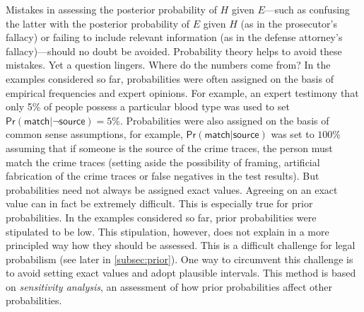 \documentclass{article}
\newcommand{\pr}{\mathsf{Pr}}
\begin{document}
Mistakes in assessing the posterior probability of $H$ given $E$---such as confusing the latter with the posterior probability of $E$ given $H$ (as in the prosecutor's fallacy) or failing to include relevant information (as in the defense attorney's fallacy)---should no doubt be avoided. Probability theory helps to avoid these mistakes. %
Yet a question lingers. Where do the numbers come from? In the examples considered so far, probabilities were often assigned on the basis of empirical frequencies and expert opinions. For example, an expert testimony that only 5\% of people possess a particular blood type was used to set $\pr(\textsf{match} \vert \neg \textsf{source})=5\%$.  Probabilities were also assigned on the basis of common sense  assumptions, for example, $\pr(\textsf{match} \vert \textsf{source})$ was set to $100\%$ assuming that if someone is the source of the crime traces, the person must match the crime traces (setting aside the possibility of framing, artificial fabrication of the crime traces or false negatives in the test results). 
%
%
But probabilities need not always be assigned exact values. Agreeing on an exact value can in fact be extremely difficult. This is especially true for prior probabilities. In the examples considered so far, prior probabilities were stipulated to be low. This stipulation, however, does not explain in a more principled way how they should be assessed. This is a difficult challenge for legal probabilism (see later in \ref{subsec:prior}). One way to circumvent this challenge is to avoid setting exact values and adopt plausible intervals. This method is based on \textit{sensitivity analysis}, an assessment of how prior probabilities affect other probabilities. 
\end{document}
